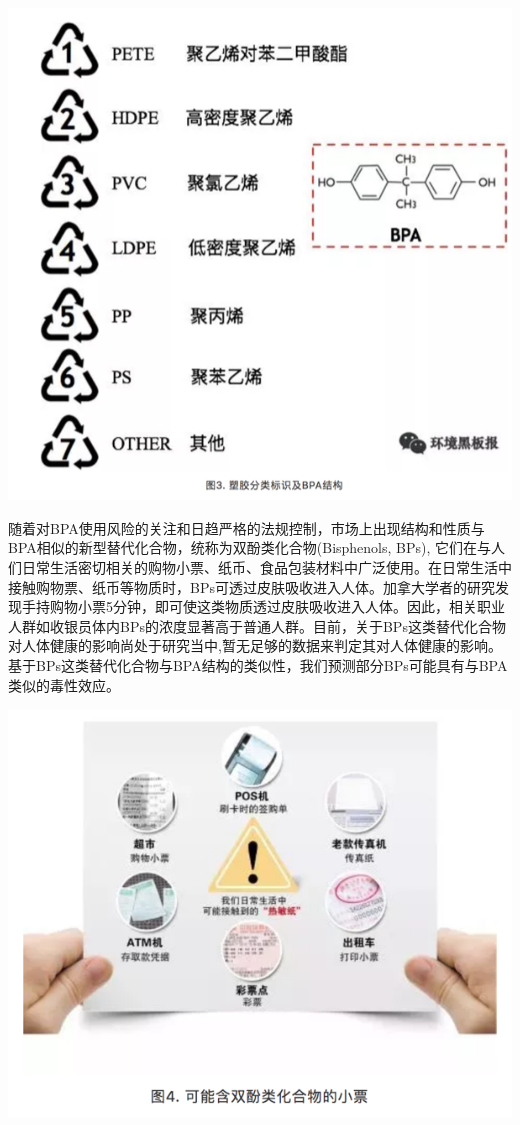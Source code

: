 \documentclass[]{book}
\begin{document}
\includegraphics[width=8.33in]{images/epc3}

随着对BPA使用风险的关注和日趋严格的法规控制，市场上出现结构和性质与BPA相似的新型替代化合物，统称为双酚类化合物(Bisphenols, BPs), 它们在与人们日常生活密切相关的购物小票、纸币、食品包装材料中广泛使用。在日常生活中接触购物票、纸币等物质时，BPs可透过皮肤吸收进入人体。加拿大学者的研究发现手持购物小票5分钟，即可使这类物质透过皮肤吸收进入人体。因此，相关职业人群如收银员体内BPs的浓度显著高于普通人群。目前，关于BPs这类替代化合物对人体健康的影响尚处于研究当中,暂无足够的数据来判定其对人体健康的影响。基于BPs这类替代化合物与BPA结构的类似性，我们预测部分BPs可能具有与BPA类似的毒性效应。

\includegraphics[width=8.33in]{images/epc4}
\end{document}
